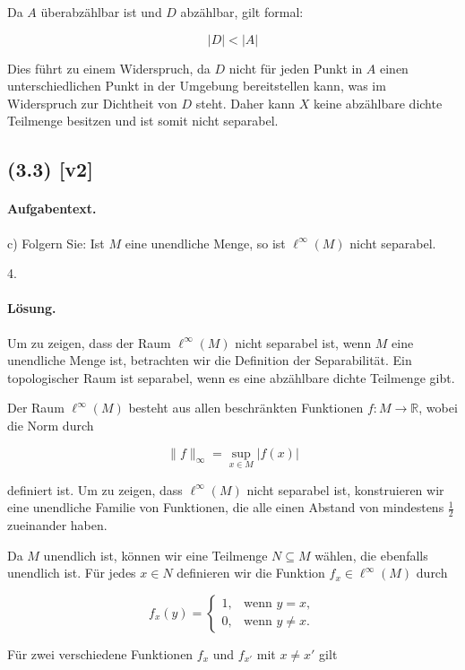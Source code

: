 \documentclass[11pt,a4paper]{article}
\begin{document}
Da \(A\) überabzählbar ist und \(D\) abzählbar, gilt formal:

\[
|D| < |A|
\]

Dies führt zu einem Widerspruch, da \(D\) nicht für jeden Punkt in \(A\) einen unterschiedlichen Punkt in der Umgebung bereitstellen kann, was im Widerspruch zur Dichtheit von \(D\) steht. Daher kann \(X\) keine abzählbare dichte Teilmenge besitzen und ist somit nicht separabel.


\subsection*{(3.3) [v2]}
\paragraph{Aufgabentext.}
c) Folgern Sie: Ist $M$ eine unendliche Menge, so ist $\ell^{\infty}(M)$ nicht separabel.


4.

\paragraph{Lösung.}
Um zu zeigen, dass der Raum $\ell^{\infty}(M)$ nicht separabel ist, wenn $M$ eine unendliche Menge ist, betrachten wir die Definition der Separabilität. Ein topologischer Raum ist separabel, wenn es eine abzählbare dichte Teilmenge gibt.

Der Raum $\ell^{\infty}(M)$ besteht aus allen beschränkten Funktionen $f: M \to \mathbb{R}$, wobei die Norm durch

\[
\|f\|_{\infty} = \sup_{x \in M} |f(x)|
\]

definiert ist. Um zu zeigen, dass $\ell^{\infty}(M)$ nicht separabel ist, konstruieren wir eine unendliche Familie von Funktionen, die alle einen Abstand von mindestens $\frac{1}{2}$ zueinander haben.

Da $M$ unendlich ist, können wir eine Teilmenge $N \subseteq M$ wählen, die ebenfalls unendlich ist. Für jedes $x \in N$ definieren wir die Funktion $f_x \in \ell^{\infty}(M)$ durch

\[
f_x(y) = 
\begin{cases} 
1, & \text{wenn } y = x, \\
0, & \text{wenn } y \neq x.
\end{cases}
\]

Für zwei verschiedene Funktionen $f_x$ und $f_{x'}$ mit $x \neq x'$ gilt
\end{document}
